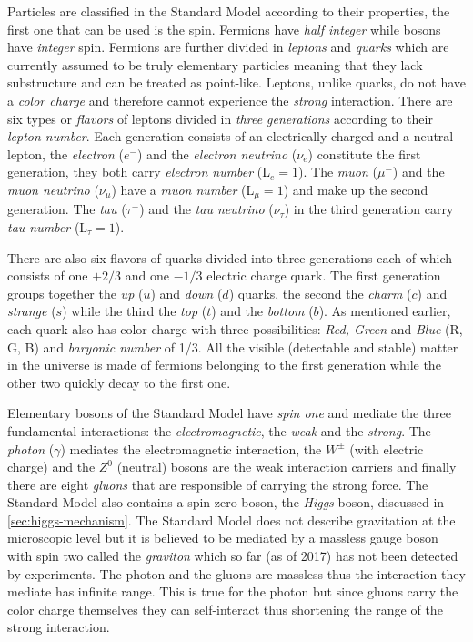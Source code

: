 Particles are classified in the Standard Model according to their properties,
the first one that can be used is the spin. Fermions have \emph{half integer}
while bosons have \emph{integer} spin. Fermions are further divided in
\emph{leptons} and \emph{quarks} which are currently assumed to be truly
elementary particles meaning that they lack substructure and can be treated as
point-like. Leptons, unlike quarks, do not have a \emph{color charge} and
therefore cannot experience the \emph{strong} interaction. There are six types
or \emph{flavors} of leptons divided in \emph{three generations} according to
their \emph{lepton number}. Each generation consists of an electrically charged
and a neutral lepton, the \emph{electron} ($e^-$) and the \emph{electron
  neutrino} ($\nu_e$) constitute the first generation, they both carry
\emph{electron number} (L$_e = 1$). The \emph{muon} ($\mu^-$) and the \emph{muon
  neutrino} ($\nu_\mu$) have a \emph{muon number} (L$_\mu = 1$) and make up the
second generation. The \emph{tau} ($\tau^-$) and the \emph{tau neutrino}
($\nu_\tau$) in the third generation carry \emph{tau number} (L$_\tau = 1$).

There are also six flavors of quarks divided into three generations each of
which consists of one $+2/3$ and one $-1/3$ electric charge quark. The first
generation groups together the \emph{up} ($u$) and \emph{down} ($d$) quarks, the
second the \emph{charm} ($c$) and \emph{strange} ($s$) while the third the
\emph{top} ($t$) and the \emph{bottom} ($b$). As mentioned earlier, each quark
also has color charge with three possibilities: \emph{Red, Green} and
\emph{Blue} (R, G, B) and \emph{baryonic number} of 1/3. All the visible
(detectable and stable) matter in the universe is made of fermions belonging to
the first generation while the other two quickly decay to the first one.

Elementary bosons of the Standard Model have \emph{spin one} and mediate the
three fundamental interactions: the \emph{electromagnetic}, the \emph{weak} and
the \emph{strong}. The \emph{photon} ($\gamma$) mediates the electromagnetic
interaction, the $W^\pm$ (with electric charge) and the $Z^0$ (neutral) bosons
are the weak interaction carriers and finally there are eight \emph{gluons} that
are responsible of carrying the strong force. The Standard Model also contains a
spin zero boson, the \emph{Higgs} boson, discussed in
\cref{sec:higgs-mechanism}. The Standard Model does not describe gravitation at
the microscopic level but it is believed to be mediated by a massless gauge
boson with spin two called the \emph{graviton} which so far (as of 2017) has not
been detected by experiments. The photon and the gluons are massless thus
the interaction they mediate has infinite range. This is true for the photon but
since gluons carry the color charge themselves they can self-interact thus
shortening the range of the strong interaction.

